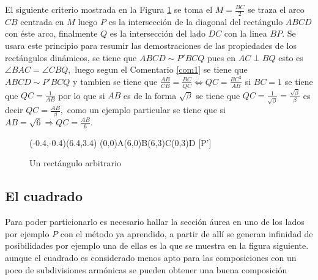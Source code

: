 \begin{comen}

	El siguiente criterio mostrada en la Figura \ref{Upu} se toma el $M=\frac{BC}{2}$ se traza el arco $CB$ centrada en $M$ luego $P$ es la intersección de la diagonal del rectángulo $ABCD$ con éste arco, finalmente $Q$ es la intersección del lado $DC$ con la linea $BP$. Se usara este principio para resumir las demostraciones de las propiedades de los rectángulos dinámicos, se tiene que $ABCD\sim P'BCQ$ pues en $AC\perp BQ$ esto es $\angle{BAC}=\angle{CBQ},$
	luego segun el Comentario \ref{com1} se tiene que $ABCD\sim P'BCQ$ y tambien se tiene que $\frac{AB}{CB}=\frac{BC}{QC}\Longleftrightarrow QC=\frac{BC^2}{AB}$ si $BC=1$ se tiene que $QC=\frac{1}{AB}$ por lo que si $AB$ es de la forma $\sqrt{\beta}$ se tiene que $QC=\frac{1}{\sqrt{\beta}}=\frac{\sqrt{\beta}}{\beta}$ es decir $QC=\frac{AB}{\beta},$ como un ejemplo particular se tiene que si $AB=\sqrt{6}\Longrightarrow QC=\frac{AB}{6}.$

	\begin{figure}[!ht]
		\begin{center}
			\begin{pspicture}(-0.4,-0.4)(6.4,3.4)
				\pstGeonode[CurveType=polygon,unit=1,PosAngle={-90,-90,90,90}](0,0){A}(6,0){B}(6,3){C}(0,3){D}
				[P']
			\end{pspicture}
		\end{center}
		\caption{Un rectángulo arbitrario}\label{Upu}
	\end{figure}

\end{comen}



\subsection{El cuadrado}
Para poder particionarlo es necesario hallar la sección áurea en uno de los lados por ejemplo $P$ con el método ya aprendido, a partir de allí se generan infinidad de posibilidades  por ejemplo una de ellas es la que se muestra en la figura siguiente. aunque el cuadrado es considerado menos apto para las composiciones con un poco de subdivisiones armónicas se pueden obtener una buena composición


